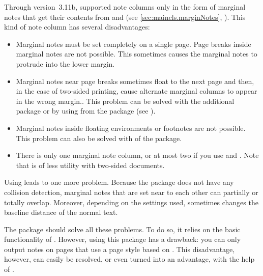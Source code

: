 \BeginIndexGroup
{}%
Through version~3.11b, \KOMAScript{} supported note columns only in the form
of marginal notes that get their contents from 
and  (see \autoref{sec:maincls.marginNotes},
). This kind of note column has several
disadvantages:
\begin{itemize}
\item Marginal notes must be set completely on a single page. Page
  breaks inside marginal notes are not possible. This
  sometimes causes the marginal notes to protrude into the lower margin.
\item Marginal notes near page breaks sometimes float to the next page and
  then, in the case of two-sided printing, cause alternate marginal columns to
  appear in the wrong margin.. This
  problem can be solved with the additional package
   or by using 
  from the  package (see
    \cite{package:marginnote}).
\item Marginal notes inside floating environments or footnotes are not possible. This
  problem can also be solved with  of the
   package.
\item There is only one marginal note column,
  or at most two if you use  and
  . Note that  is of less
  utility with two-sided documents.
\end{itemize}
Using  leads to one more problem.
Because the package does not have any collision detection, marginal notes that
are set near to each other can partially or totally overlap. Moreover,
depending on the settings used,  sometimes changes the
baseline distance of the normal text.

The  package should solve all these problems. To
do so, it relies on the basic functionality of
\hyperref[cha:scrlayer]{}%
. However, using this
package has a drawback: you can only output notes on
pages that use a page style based on
\hyperref[cha:scrlayer]{}. This disadvantage, however, can
easily be resolved, or even turned into an advantage, with the help of
\hyperref[cha:scrlayer-scrpage]{}%
%
.


